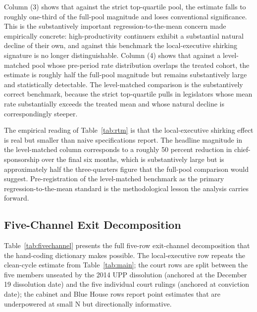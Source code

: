 \documentclass[11pt]{article}
\begin{document}
Column (3) shows that against the strict top-quartile pool, the estimate falls to roughly one-third of the full-pool magnitude and loses conventional significance. This is the substantively important regression-to-the-mean concern made empirically concrete: high-productivity continuers exhibit a substantial natural decline of their own, and against this benchmark the local-executive shirking signature is no longer distinguishable. Column (4) shows that against a level-matched pool whose pre-period rate distribution overlaps the treated cohort, the estimate is roughly half the full-pool magnitude but remains substantively large and statistically detectable. The level-matched comparison is the substantively correct benchmark, because the strict top-quartile pulls in legislators whose mean rate substantially exceeds the treated mean and whose natural decline is correspondingly steeper.

The empirical reading of Table~\ref{tab:rtm} is that the local-executive shirking effect is real but smaller than naive specifications report. The headline magnitude in the level-matched column corresponds to a roughly 50 percent reduction in chief-sponsorship over the final six months, which is substantively large but is approximately half the three-quarters figure that the full-pool comparison would suggest. Pre-registration of the level-matched benchmark as the primary regression-to-the-mean standard is the methodological lesson the analysis carries forward.

\subsection{Five-Channel Exit Decomposition}

Table~\ref{tab:fivechannel} presents the full five-row exit-channel decomposition that the hand-coding dictionary makes possible. The local-executive row repeats the clean-cycle estimate from Table~\ref{tab:main}; the court rows are split between the five members unseated by the 2014 UPP dissolution (anchored at the December 19 dissolution date) and the five individual court rulings (anchored at conviction date); the cabinet and Blue House rows report point estimates that are underpowered at small N but directionally informative.
\end{document}
